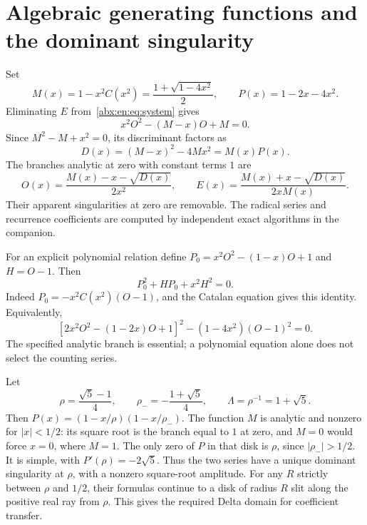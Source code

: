 \documentclass[11pt,letterpaper]{article}
\numberwithin{equation}{section}
\theoremstyle{remark}\newtheorem{remark}[theorem]{Remark}
\begin{document}
\section{Algebraic generating functions and the dominant singularity}\label{abx:en:sec:algebraic}
Set
\begin{equation}\label{abx:en:eq:MP}
 M(x)=1-x^2C(x^2)=\frac{1+\sqrt{1-4x^2}}2,\qquad
 P(x)=1-2x-4x^2.
\end{equation}
Eliminating $E$ from~\eqref{abx:en:eq:system} gives
\begin{equation}\label{abx:en:eq:quadratic}
 x^2O^2-(M-x)O+M=0.
\end{equation}
Since $M^2-M+x^2=0$, its discriminant factors as
\begin{equation}\label{abx:en:eq:D}
 D(x)=(M-x)^2-4Mx^2=M(x)P(x).
\end{equation}
The branches analytic at zero with constant terms $1$ are
\begin{equation}\label{abx:en:eq:radicals}
 O(x)=\frac{M(x)-x-\sqrt{D(x)}}{2x^2},\qquad
 E(x)=\frac{M(x)+x-\sqrt{D(x)}}{2xM(x)}.
\end{equation}
Their apparent singularities at zero are removable. The radical series
and recurrence coefficients are computed by independent exact algorithms
in the companion.

For an explicit polynomial relation define
$P_0=x^2O^2-(1-x)O+1$ and $H=O-1$. Then
\begin{equation}\label{abx:en:eq:quartic}
 P_0^2+HP_0+x^2H^2=0.
\end{equation}
Indeed $P_0=-x^2C(x^2)(O-1)$, and the Catalan equation gives this
identity. Equivalently,
\[
 [2x^2O^2-(1-2x)O+1]^2-(1-4x^2)(O-1)^2=0.
\]
The specified analytic branch is essential; a polynomial equation alone
does not select the counting series.

Let
\begin{equation}\label{abx:en:eq:rho}
 \rho=\frac{\sqrt5-1}{4},\qquad
 \rho_-=-\frac{1+\sqrt5}{4},\qquad
 \Lambda=\rho^{-1}=1+\sqrt5.
\end{equation}
Then $P(x)=(1-x/\rho)(1-x/\rho_-)$.
The function $M$ is analytic and nonzero for $|x|<1/2$: its square
root is the branch equal to $1$ at zero, and $M=0$ would force
$x=0$, where $M=1$. The only zero of $P$ in that disk is $\rho$,
since $|\rho_-|>1/2$. It is simple, with $P'(\rho)=-2\sqrt5$.
Thus the two series have a unique dominant singularity at $\rho$,
with a nonzero square-root amplitude. For any $R$ strictly between
$\rho$ and $1/2$, their formulas continue to a disk of radius $R$
slit along the positive real ray from $\rho$. This gives the required
Delta domain for coefficient transfer.
\end{document}
